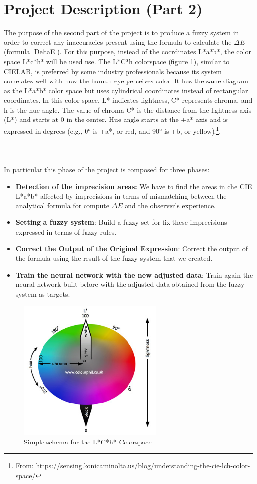 \documentclass{article}
\begin{document}
\section{Project Description (Part 2) }
The purpose of the second part of the project is to produce a fuzzy system in order to correct any inaccuracies present using the formula to calculate the $\Delta E$ (formula \ref{DeltaE}). For this purpose, instead of the coordinates L*a*b*, the color space L*c*h* will be used use. The L*C*h colorspace (figure \ref{fig:clhcolorspace}), similar to CIELAB, is preferred by some industry professionals because its system correlates well with how the human eye perceives color. It has the same diagram as the L*a*b* color space but uses cylindrical coordinates instead of rectangular coordinates.
In this color space, L* indicates lightness, C* represents chroma, and h is the hue angle. The value of chroma C* is the distance from the lightness axis (L*) and starts at 0 in the center. Hue angle starts at the +a* axis and is expressed in degrees (e.g., 0° is +a*, or red, and 90° is +b, or yellow).\footnote{From: https://sensing.konicaminolta.us/blog/understanding-the-cie-lch-color-space/}. \\\\\\\\In particular this phase of the project is composed for three phases: 
\begin{itemize}
	\item\textbf{Detection of the imprecision areas:} We have to find the areas in che CIE L*a*b* affected by imprecisions in terms of mismatching between the analytical formula for compute $\Delta E$ and the observer's experience.
	\item\textbf{Setting a fuzzy system}: Build a fuzzy set for fix these imprecisions expressed in terms of fuzzy rules.
	\item\textbf{Correct the Output of the Original Expression}: Correct the output of the formula using the result of the fuzzy system that we created.
	\item\textbf{Train the neural network with the new adjusted data}: Train again the neural network built before with the adjusted data obtained from the fuzzy system as targets. 
\end{itemize}
	
	
\begin{figure}[!h]
	\center
 	\includegraphics[width=200pt]{./img/lchcolor.jpg}
  	\caption{Simple schema for the L*C*h* Colorspace}\label{fig:clhcolorspace}
\end{figure}
\end{document}
